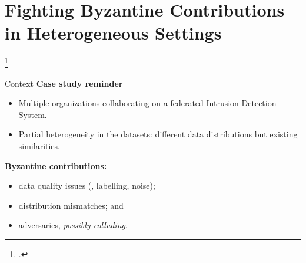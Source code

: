 

\section[\texttt{RADAR}]{Fighting Byzantine Contributions in Heterogeneous Settings}


\begin{frame}[plain]
  \sectionpage

  \footcite*{lavaur_radar_2024}
\end{frame}


\begin{frame}{Context}
  \textbf{Case study reminder}
  \begin{itemize}
    \item Multiple organizations collaborating on a federated Intrusion Detection System.
    \item Partial heterogeneity in the datasets: different data distributions but existing similarities.
  \end{itemize}

  \pause
  \textbf{Byzantine contributions:}
  \begin{itemize}
    \item data quality issues (\eg, labelling, noise);
    \item distribution mismatches; and
    \item adversaries, \textit{possibly colluding}.

  \end{itemize}

\end{frame}

